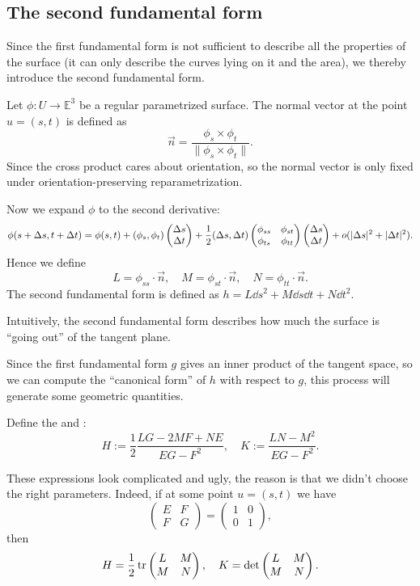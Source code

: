 

\subsection{The second fundamental form}
\label{sub:The second fundamental form}
Since the first fundamental form is not sufficient to describe
all the properties of the surface (it can only describe the curves lying
on it and the area), we thereby introduce the second fundamental form.

\begin{definition}
	Let $\phi:U\to \mathbb{E}^3$ be a regular parametrized surface.
	The normal vector at the point $u=(s,t)$ is defined as
	\[
		\vec{n} = \frac{\phi_s\times \phi_t}{\lVert \phi_s\times \phi_t \rVert }.
	\]
	Since the cross product cares about orientation, so
	the normal vector is only fixed under orientation-preserving
	reparametrization.

	Now we expand $\phi$ to the second derivative:
	\[
	\phi(s+\Delta s, t+\Delta t) =
	\phi(s,t) + (\phi_s, \phi_t)\begin{pmatrix} \Delta s\\\Delta t \end{pmatrix}
	+ \frac{1}{2} (\Delta s, \Delta t)\begin{pmatrix}
		\phi_{ss} &\phi_{st}\\ \phi_{ts} &\phi_{tt}
	\end{pmatrix} \begin{pmatrix} \Delta s\\\Delta t \end{pmatrix}
	+ o(|\Delta s|^2 + |\Delta t|^2).
	\]
	Hence we define
	\[
	L = \phi_{ss}\cdot\vec{n}, \quad M = \phi_{st}\cdot\vec{n},
	\quad N = \phi_{tt}\cdot\vec{n}.
	\]
	The second fundamental form is defined as
	$h = L\dd s^2 + M\dd s\dd t + N\dd t^2$.
\end{definition}

Intuitively, the second fundamental form describes
how much the surface is ``going out'' of the tangent plane.

Since the first fundamental form $g$ gives an inner product of
the tangent space, so we can compute the ``canonical form'' of
$h$ with respect to $g$, this process will generate some geometric quantities.

\begin{definition}
	Define the  and :
	\[
	H:= \frac{1}{2}\frac{LG-2MF+NE}{EG-F^2},\quad
	K:= \frac{LN-M^2}{EG-F^2}.
\]
\end{definition}

These expressions look complicated and ugly, the reason is that we didn't
choose the right parameters. Indeed, if at some point $u=(s,t)$ we have
\[
\begin{pmatrix} E &F\\F&G \end{pmatrix} =
\begin{pmatrix} 1&0\\0&1 \end{pmatrix},
\]
then
\[
H = \frac{1}{2} \operatorname{tr} \begin{pmatrix} L&M\\M&N \end{pmatrix}, \quad
K = \det \begin{pmatrix} L&M\\M&N \end{pmatrix}.
\]


